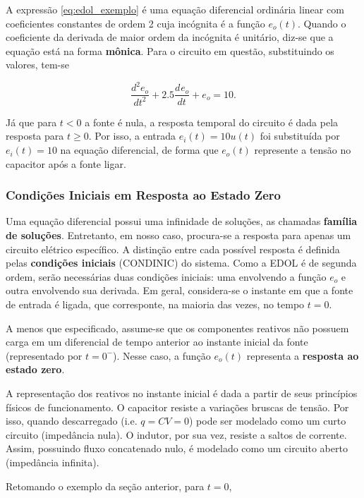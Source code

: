 \documentclass{article}
\numberwithin{equation}{section}
\newcommand{\deo}[1]{\dfrac{d^{#1}e_o}{dt^{#1}}}
\begin{document}
\noindent A expressão \eqref{eq:edol_exemplo} é uma equação diferencial ordinária linear com coeficientes constantes de ordem 2 cuja incógnita é a função $e_{o}(t)$. Quando o coeficiente da derivada de maior ordem da incógnita é unitário, diz-se que a equação está na forma \textbf{mônica}. Para o circuito em questão, substituindo os valores, tem-se

\begin{equation}
    \deo{2}+ 2.5 \deo{} + e_o = 10.
\end{equation}

\noindent Já que para $t<0$ a fonte é nula, a resposta temporal do circuito é dada pela resposta para $t \geqslant 0$. Por isso, a entrada $e_i(t)=10u(t)$ foi substituída por $e_i(t)=10$ na equação diferencial, de forma que $e_o(t)$ represente a tensão no capacitor após a fonte ligar.

\subsubsection{Condições Iniciais em Resposta ao Estado Zero}
\label{subsubsec:condinics}

Uma equação diferencial possui uma infinidade de soluções, as chamadas \textbf{família de soluções}. Entretanto, em nosso caso, procura-se a resposta para apenas um circuito elétrico específico. A distinção entre cada possível resposta é definida pelas \textbf{condições iniciais} (CONDINIC) do sistema. Como a EDOL é de segunda ordem, serão necessárias duas condições iniciais: uma envolvendo a função $e_o$ e outra envolvendo sua derivada. Em geral, considera-se o instante em que a fonte de entrada é ligada, que corresponte, na maioria das vezes, no tempo $t=0$.

A menos que especificado, assume-se que os componentes reativos não possuem carga em um diferencial de tempo anterior ao instante inicial da fonte (representado por $t=0^-$). Nesse caso, a função $e_o(t)$ representa a \textbf{resposta ao estado zero}.

A representação dos reativos no instante inicial é dada a partir de seus princípios físicos de funcionamento. O capacitor resiste a variações bruscas de tensão. Por isso, quando descarregado (i.e. $q=CV=0$) pode ser modelado como um curto circuito (impedância nula). O indutor, por sua vez, resiste a saltos de corrente. Assim, possuindo fluxo concatenado nulo, é modelado como um circuito aberto (impedância infinita).

Retomando o exemplo da seção anterior, para $t=0$,
\end{document}
